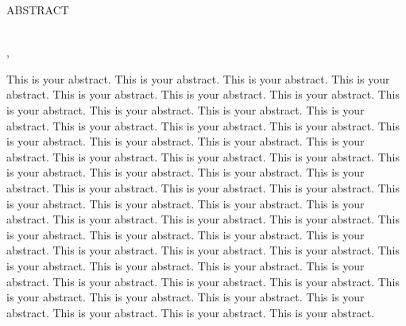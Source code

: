 
\newcommand{\triplespacing}{\setstretch {3}}

\begin{singlespacing}
\begin{center}
\MakeUppercase{ABSTRACT}\\
\MakeUppercase{\thesistitle}
\end{center}
\end{singlespacing}


{
\setlength{\parskip}{1em}
\begin{doublespacing}
\begin{center}
\name\\
\university, \submissionyear\\
\end{center}
\end{doublespacing}
}

{
\begin{singlespacing}
\begin{flushleft}
\setlength{\parindent}{0.5in}
\setlength{\parskip}{1em}

\indent\indent This is your abstract. This is your abstract. This is your abstract. This is your abstract. This is your abstract. This is your abstract. This is your abstract. This is your abstract. This is your abstract. This is your abstract. This is your abstract. This is your abstract. This is your abstract. This is your abstract. This is your abstract. This is your abstract. This is your abstract. This is your abstract. This is your abstract. This is your abstract. This is your abstract. This is your abstract. This is your abstract. This is your abstract. This is your abstract. This is your abstract. This is your abstract. This is your abstract. This is your abstract. This is your abstract. This is your abstract. This is your abstract. This is your abstract. This is your abstract. This is your abstract. This is your abstract. This is your abstract. This is your abstract. This is your abstract. This is your abstract. This is your abstract. This is your abstract. This is your abstract. This is your abstract. This is your abstract. This is your abstract. This is your abstract. This is your abstract. This is your abstract. This is your abstract. This is your abstract. This is your abstract. This is your abstract. This is your abstract. This is your abstract. This is your abstract.



\phantom{This text will be invisible}
\end{flushleft}
\end{singlespacing}
}
